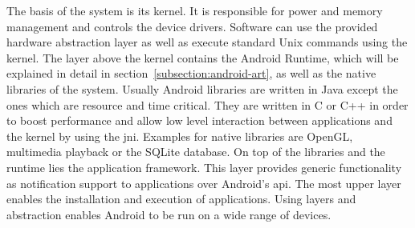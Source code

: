 The basis of the system is its kernel.
It is responsible for power and memory management and controls the device drivers.
Software can use the provided hardware abstraction layer as well as execute standard Unix commands using the kernel.
\newline
The layer above the kernel contains the Android Runtime, which will be explained in detail in section~\ref{subsection:android-art}, as well as the native libraries of the system.
Usually Android libraries are written in Java except the ones which are resource and time critical.
They are written in C or C++ in order to boost performance and allow low level interaction between applications and the kernel by using the \gls{jni}.
Examples for native libraries are OpenGL, multimedia playback or the SQLite database.
\newline
On top of the libraries and the runtime lies the application framework.
This layer provides generic functionality as notification support to applications over Android's \gls{api}.
\newline
The most upper layer enables the installation and execution of applications.
\newline
Using layers and abstraction enables Android to be run on a wide range of devices.





